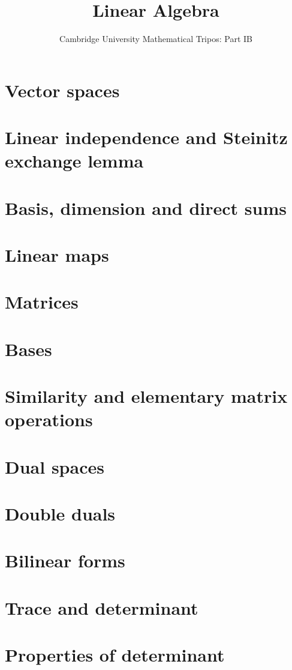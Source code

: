 \documentclass{article}
\title{Linear Algebra}
\author{Cambridge University Mathematical Tripos: Part IB}
\begin{document}
\maketitle

\tableofcontentsnewpage{}

\section{Vector spaces}

\section{Linear independence and Steinitz exchange lemma}

\section{Basis, dimension and direct sums}

\section{Linear maps}

\section{Matrices}

\section{Bases}

\section{Similarity and elementary matrix operations}

\section{Dual spaces}

\section{Double duals}

\section{Bilinear forms}

\section{Trace and determinant}

\section{Properties of determinant}

\end{document}
